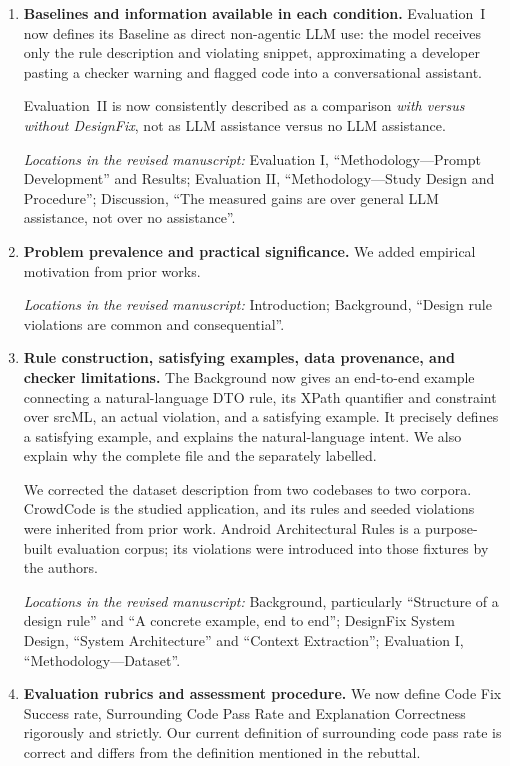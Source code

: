 \documentclass[11pt]{article}
\newcommand{\location}[1]{%
  \par\nobreak\smallskip
  \textit{Locations in the revised manuscript:} #1.
}
\begin{document}
\begin{enumerate}

\item \textbf{Baselines and information available in each condition.}
Evaluation~I now defines its Baseline as direct non-agentic LLM use: the model
receives only the rule description and violating snippet, approximating a
developer pasting a checker warning and flagged code into a conversational
assistant. 

Evaluation~II is now consistently described as a comparison \emph{with versus
without DesignFix}, not as LLM assistance versus no LLM assistance. 

\location{Evaluation I, ``Methodology---Prompt Development'' and Results;
Evaluation II, ``Methodology---Study Design and Procedure''; Discussion,
``The measured gains are over general LLM assistance, not over no assistance''}

\item \textbf{Problem prevalence and practical significance.}
We added empirical motivation from prior works.

\location{Introduction; Background, ``Design rule violations are common and
consequential''}

\item \textbf{Rule construction, satisfying examples, data provenance, and
checker limitations.}
The Background now gives an end-to-end example connecting a natural-language
DTO rule, its XPath quantifier and constraint over srcML, an actual violation,
and a satisfying example.  It precisely defines a satisfying example,
and explains the natural-language intent.  We also explain why the complete file and
the separately labelled.

We corrected the dataset description from two codebases to two corpora.
CrowdCode is the studied application, and its rules and seeded violations were
inherited from prior work.  Android Architectural Rules is a purpose-built
evaluation corpus; its violations were introduced into those fixtures by
the authors. 

\location{Background, particularly ``Structure of a design rule'' and ``A
concrete example, end to end''; DesignFix System Design, ``System
Architecture'' and ``Context Extraction''; Evaluation I,
``Methodology---Dataset''}

\item \textbf{Evaluation rubrics and assessment procedure.}
We now define Code Fix Success rate, Surrounding Code Pass Rate and Explanation Correctness rigorously and strictly. Our current definition of surrounding code pass rate is correct and differs from the definition mentioned in the rebuttal.


\end{enumerate}
\end{document}
